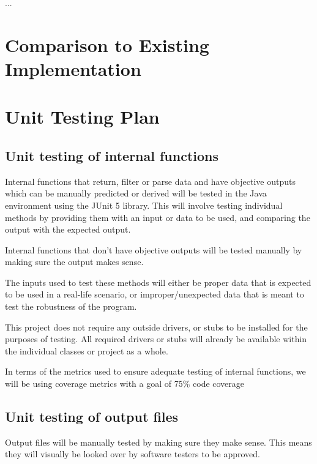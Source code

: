\documentclass[12pt, titlepage]{article}
\begin{document}
...

	
\section{Comparison to Existing Implementation}	
				
\section{Unit Testing Plan}
		
\subsection{Unit testing of internal functions} 

\hspace{\parindent} Internal functions that return, filter or parse data and have objective outputs which can be manually predicted or derived will be tested in the Java environment using the JUnit 5 library. This will involve testing individual methods by providing them with an input or data to be used, and comparing the output with the expected output.

Internal functions that don't have objective outputs will be tested manually by making sure the output makes sense.

The inputs used to test these methods will either be proper data that is expected to be used in a real-life scenario, or improper/unexpected data that is meant to test the robustness of the program.

This project does not require any outside drivers, or stubs to be installed for the purposes of testing. All required drivers or stubs will already be available within the individual classes or project as a whole.

In terms of the metrics used to ensure adequate testing of internal functions, we will be using coverage metrics with a goal of 75\% code coverage
		
\subsection{Unit testing of output files}
\hspace{\parindent}Output files will be manually tested by making sure they make sense. This means they will visually be looked over by software testers to be approved.
\end{document}
